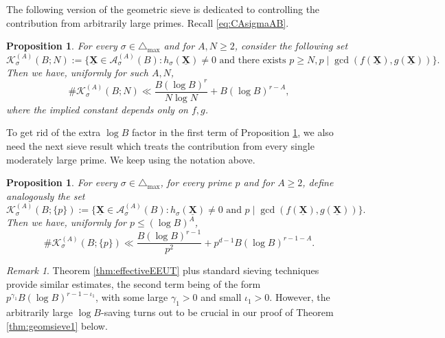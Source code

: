 \documentclass[11pt,letterpaper]{amsart}
\newcommand{\CA}{{\mathcal {A}}}
\newcommand{\CK}{{\mathcal {K}}}
\newcommand{\XX}{\underline{\mathbf{X}}}
\theoremstyle{plain}
\numberwithin{equation}{section}
\newtheorem{proposition}[theorem]{Proposition}
\theoremstyle{definition}
\theoremstyle{remark}
\newtheorem{remark}[theorem]{Remark}
\begin{document}
The following version of the geometric sieve is dedicated to controlling the contribution from arbitrarily large primes. Recall \eqref{eq:CAsigmaAB}.
\begin{proposition}\label{prop:geomsieve1}
For every $\sigma\in\triangle_{\max}$ and for $A,N\geqslant 2$, consider the following set
\begin{equation}\label{eq:CBMB}
 \CK_{\sigma}^{(A)}(B;N):=\{\XX\in\CA_\sigma^{(A)}(B):h_\sigma(\XX)\neq 0 \text{ and there exists } p\geqslant N,p\mid \gcd(f(\XX),g(\XX))\}.
\end{equation}
Then we have, uniformly for such $A,N$,
$$\#\CK_{\sigma}^{(A)}(B;N)\ll\frac{B(\log B)^r}{N\log N}+B(\log B)^{r-A},$$ where the implied constant depends only on $f,g$.
\end{proposition}



To get rid of the extra $\log B$ factor in the first term of Proposition \ref{prop:geomsieve1}, we also need the next sieve result which treats the contribution from every single moderately large prime. We keep using the notation above.
\begin{proposition}\label{prop:geomsieve2}
For every $\sigma\in\triangle_{\max}$, for every prime $p$ and for $A\geqslant 2$, define analogously the set
	$$\CK_{\sigma}^{(A)}(B;\{p\}):=\{\XX\in\CA_\sigma^{(A)}(B):h_\sigma(\XX)\neq 0\text{ and }p\mid \gcd(f(\XX),g(\XX))\}.$$ 
	Then we have, uniformly for $p\leqslant (\log B)^{A}$, 
	$$\#\CK_{\sigma}^{(A)}(B;\{p\})\ll \frac{B(\log B)^{r-1}}{p^2}+p^{d-1}B(\log B)^{r-1-A}.$$
\end{proposition}
\begin{remark}
	Theorem \ref{thm:effectiveEEUT} plus standard sieving techniques provide similar estimates, the second term being of the form $p^{\gamma_1}B(\log B)^{r-1-\iota_1}$, with some large $\gamma_1>0$ and small $\iota_1>0$. However, the arbitrarily large $\log B$-saving turns out to be crucial in our proof of Theorem \ref{thm:geomsieve1} below.
\end{remark}
\end{document}
